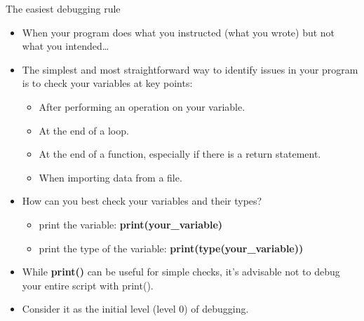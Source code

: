 \documentclass[
  8pt,
  ignorenonframetext,
]{beamer}
\providecommand{\tightlist}{%
  \setlength{\itemsep}{0pt}\setlength{\parskip}{0pt}}
\begin{document}
\begin{frame}{The easiest debugging rule}
\protect\hypertarget{the-easiest-debugging-rule}{}
\begin{itemize}[<+->]
\tightlist
\item
  When your program does what you instructed (what you wrote) but not
  what you intended\ldots{}
\end{itemize}

\begin{itemize}[<+->]
\tightlist
\item
  The simplest and most straightforward way to identify issues in your
  program is to check your variables at key points:

  \begin{itemize}[<+->]
  \tightlist
  \item
    After performing an operation on your variable.
  \item
    At the end of a loop.
  \item
    At the end of a function, especially if there is a return statement.
  \item
    When importing data from a file.
  \end{itemize}
\end{itemize}

\begin{itemize}[<+->]
\tightlist
\item
  How can you best check your variables and their types?

  \begin{itemize}[<+->]
  \tightlist
  \item
    print the variable: \textbf{print(your\_variable)}
  \item
    print the type of the variable: \textbf{print(type(your\_variable))}
  \end{itemize}
\end{itemize}

\begin{itemize}[<+->]
\tightlist
\item
  While \textbf{print()} can be useful for simple checks, it's advisable
  not to debug your entire script with print().
\end{itemize}

\begin{itemize}[<+->]
\tightlist
\item
  Consider it as the initial level (level 0) of debugging.
\end{itemize}
\end{frame}
\end{document}
